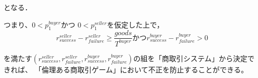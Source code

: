となる．

つまり、$ 0<p^{buyer}_1 $かつ $ 0 < p^{seller}_{1} $を仮定した上で，\\

\begin{equation}
  r^{seller}_{success} - r^{seller}_{failure} \geq \frac{goods}{T^{buyer}} かつ r^{buyer}_{success} - r^{buyer}_{failure} > 0
\end{equation}

を満たす$ (r^{seller}_{success}, r^{seller}_{failure}, r^{buyer}_{success}, r^{buyer}_{failure}) $の組を「商取引システム」から決定できれば、
「倫理ある商取引ゲーム」において不正を防止することができる。